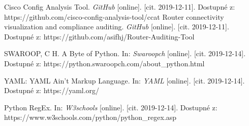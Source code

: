 \begin{literatura}{99}
Cisco Config Analysis Tool. \textit{GitHub} [online]. [cit. 2019-12-11]. Dostupné z: https://github.com/cisco-config-analysis-tool/ccat
Router connectivity visualization and compliance auditing. \textit{GitHub} [online]. [cit. 2019-12-11]. Dostupné z: https://github.com/asifhj/Router-Auditing-Tool

SWAROOP, C H. A Byte of Python. In: \textit{Swaroopch} [online]. [cit. 2019-12-14]. Dostupné z: https://python.swaroopch.com/about\_python.html

YAML: YAML Ain't Markup Language. In: \textit{YAML} [online]. [cit. 2019-12-14]. Dostupné z: https://yaml.org/

Python RegEx. In: \textit{W3schools} [online]. [cit. 2019-12-14]. Dostupné z: https://www.w3schools.com/python/python\_regex.asp


\end{literatura}


%
%
%
